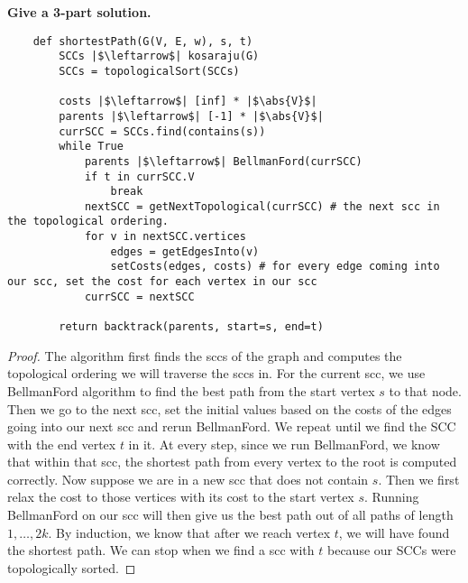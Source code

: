 \documentclass{article}
\begin{document}
\textbf{Give a 3-part solution.}
    \begin{answer}
        \begin{verbatim}
    def shortestPath(G(V, E, w), s, t)
        SCCs |$\leftarrow$| kosaraju(G)
        SCCs = topologicalSort(SCCs)

        costs |$\leftarrow$| [inf] * |$\abs{V}$|
        parents |$\leftarrow$| [-1] * |$\abs{V}$|
        currSCC = SCCs.find(contains(s))
        while True
            parents |$\leftarrow$| BellmanFord(currSCC)
            if t in currSCC.V
                break
            nextSCC = getNextTopological(currSCC) # the next scc in the topological ordering.
            for v in nextSCC.vertices
                edges = getEdgesInto(v)
                setCosts(edges, costs) # for every edge coming into our scc, set the cost for each vertex in our scc
            currSCC = nextSCC

        return backtrack(parents, start=s, end=t)
        \end{verbatim}

        \begin{proof}
            The algorithm first finds the sccs of the graph and computes the topological ordering we will traverse the sccs in. For the current scc, we use BellmanFord algorithm to find the best path from the start vertex $s$ to that node. Then we go to the next scc, set the initial values based on the costs of the edges going into our next scc and rerun BellmanFord. We repeat until we find the SCC with the end vertex $t$ in it. At every step, since we run BellmanFord, we know that within that scc, the shortest path from every vertex to the root is computed correctly. Now suppose we are in a new scc that does not contain $s$. Then we first relax the cost to those vertices with its cost to the start vertex $s$. Running BellmanFord on our scc will then give us the best path out of all paths of length $1, \ldots, 2k$. By induction, we know that after we reach vertex $t$, we will have found the shortest path. We can stop when we find a scc with $t$ because our SCCs were topologically sorted.
        \end{proof}


\end{answer}
\end{document}
